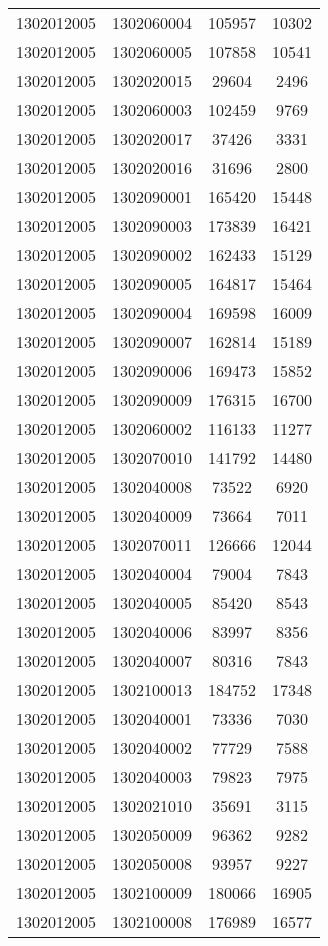 \begin{longtable}{llcc}
1302012005 & 1302060004 & 105957 & 10302\\
1302012005 & 1302060005 & 107858 & 10541\\
1302012005 & 1302020015 & 29604 & 2496\\
1302012005 & 1302060003 & 102459 & 9769\\
1302012005 & 1302020017 & 37426 & 3331\\
1302012005 & 1302020016 & 31696 & 2800\\
1302012005 & 1302090001 & 165420 & 15448\\
1302012005 & 1302090003 & 173839 & 16421\\
1302012005 & 1302090002 & 162433 & 15129\\
1302012005 & 1302090005 & 164817 & 15464\\
1302012005 & 1302090004 & 169598 & 16009\\
1302012005 & 1302090007 & 162814 & 15189\\
1302012005 & 1302090006 & 169473 & 15852\\
1302012005 & 1302090009 & 176315 & 16700\\
1302012005 & 1302060002 & 116133 & 11277\\
1302012005 & 1302070010 & 141792 & 14480\\
1302012005 & 1302040008 & 73522 & 6920\\
1302012005 & 1302040009 & 73664 & 7011\\
1302012005 & 1302070011 & 126666 & 12044\\
1302012005 & 1302040004 & 79004 & 7843\\
1302012005 & 1302040005 & 85420 & 8543\\
1302012005 & 1302040006 & 83997 & 8356\\
1302012005 & 1302040007 & 80316 & 7843\\
1302012005 & 1302100013 & 184752 & 17348\\
1302012005 & 1302040001 & 73336 & 7030\\
1302012005 & 1302040002 & 77729 & 7588\\
1302012005 & 1302040003 & 79823 & 7975\\
1302012005 & 1302021010 & 35691 & 3115\\
1302012005 & 1302050009 & 96362 & 9282\\
1302012005 & 1302050008 & 93957 & 9227\\
1302012005 & 1302100009 & 180066 & 16905\\
1302012005 & 1302100008 & 176989 & 16577\\

\end{longtable}
